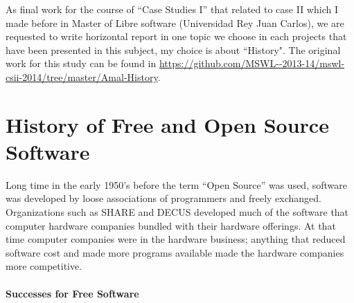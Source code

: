 \documentclass[11pt]{article} %
\begin{document}
\newpage 
\tableofcontents

\newpage

As final work for the course of “Case Studies I” that related to case II which I made before in Master of Libre software (Universidad Rey Juan Carlos), we are requested to write horizontal  report in one topic we choose in each projects that have been presented in this subject, my choice is about “History". The original work for this study can be found in  \url{https://github.com/MSWL--2013-14/mswl-csii-2014/tree/master/Amal-History}.

\section{History of Free and Open Source Software}

Long time in the early 1950's before the term “Open Source” was used, software was developed by loose associations of programmers and freely exchanged. Organizations such as SHARE and DECUS developed much of the software that computer hardware companies bundled with their hardware offerings. At that time computer companies were in the hardware business; anything that reduced software cost and made more programs available made the hardware companies more competitive.

\paragraph{Successes for Free Software}
\end{document}
